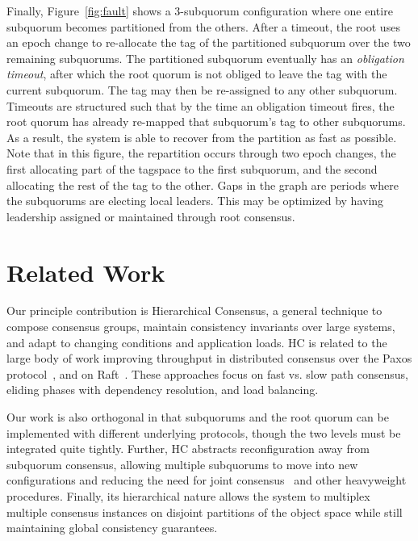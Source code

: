 \documentclass[letterpaper,10pt,twocolumn]{article}
\newcommand{\sub}{subquorum\xspace}
\newcommand{\subs}{subquorums\xspace}
\newcommand{\roo}{root quorum\xspace}
\begin{document}
Finally, Figure~\ref{fig:fault} shows a 3-\sub configuration where one entire
\sub becomes partitioned from the others.
After a timeout, the root uses an epoch change to re-allocate the tag of the
partitioned \sub over the two remaining \subs.
The partitioned \sub eventually has an \emph{obligation timeout}, after which
the \roo is not obliged to leave the tag with the current \sub.
The tag may then be re-assigned to any other \sub.
Timeouts are structured such that by the time an obligation timeout fires,
the \roo has already re-mapped that \sub's tag to other \subs.
As a result, the system is able to recover from the partition as fast as
possible.
Note that in this figure, the repartition occurs through two epoch changes,
the first allocating part of the tagspace to the first \sub, and the
second allocating the rest of the tag to the other.
Gaps in the graph are periods where the \subs are electing local leaders.
This may be optimized by having leadership assigned or maintained through
root consensus.


\section{Related Work}
\label{sec:related}

Our principle contribution is Hierarchical Consensus, a general technique to
compose consensus groups, maintain consistency invariants over large
systems, and adapt to changing conditions and application loads.
HC is related to the large body of work improving
throughput in distributed consensus over the Paxos
protocol~\cite{paxos,epaxos,flexiblePaxos,generalizedPaxos}, and on
Raft~\cite{raft,howard_raft_2015}.
These approaches focus on fast vs. slow path consensus, eliding phases with
dependency resolution, and load balancing.

Our work is also orthogonal in that \subs and the \roo can be
implemented with different underlying protocols, though the two levels must
be integrated quite tightly.
Further, HC abstracts reconfiguration away from \sub consensus, allowing
multiple \subs to move into new configurations and reducing the need
for joint consensus~\cite{raft} and other heavyweight procedures.
Finally, its hierarchical nature allows the system to multiplex multiple
consensus instances on disjoint partitions of the object space while
still maintaining global consistency guarantees.
\end{document}
